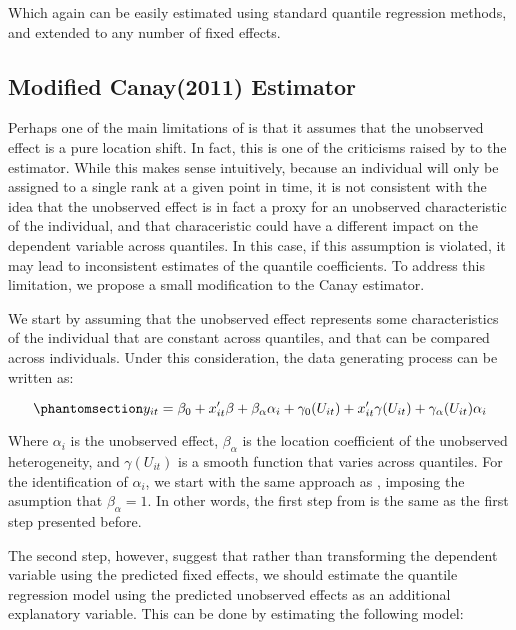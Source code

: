 \documentclass[bib]{statapress}
\begin{document}
Which again can be easily estimated using standard quantile regression
methods, and extended to any number of fixed effects.

\subsection{Modified Canay(2011) Estimator}\label{sec-mcanay}

Perhaps one of the main limitations of \citet{canay2011} is that it
assumes that the unobserved effect is a pure location shift. In fact,
this is one of the criticisms raised by \citet{mss2019} to the
estimator. While this makes sense intuitively, because an individual
will only be assigned to a single rank at a given point in time, it is
not consistent with the idea that the unobserved effect is in fact a
proxy for an unobserved characteristic of the individual, and that
characeristic could have a different impact on the dependent variable
across quantiles. In this case, if this assumption is violated, it may
lead to inconsistent estimates of the quantile coefficients. To address
this limitation, we propose a small modification to the Canay estimator.

We start by assuming that the unobserved effect represents some
characteristics of the individual that are constant across quantiles,
and that can be compared across individuals. Under this consideration,
the data generating process can be written as:

\begin{equation}\phantomsection\label{eq-mcanay-dgp}{y_{it} =\beta_0 +   x_{it}'\beta + \beta_\alpha \alpha_i+
\gamma_0(U_{it}) +  x_{it}'\gamma(U_{it}) + \gamma_\alpha(U_{it}) \alpha_i
}\end{equation}

Where \(\alpha_i\) is the unobserved effect, \(\beta_\alpha\) is the
location coefficient of the unobserved heterogeneity, and
\(\gamma(U_{it})\) is a smooth function that varies across quantiles.
For the identification of \(\alpha_i\), we start with the same approach
as \citet{canay2011}, imposing the asumption that \(\beta_\alpha=1\). In
other words, the first step from \citet{canay2011} is the same as the
first step presented before.

The second step, however, suggest that rather than transforming the
dependent variable using the predicted fixed effects, we should estimate
the quantile regression model using the predicted unobserved effects as
an additional explanatory variable. This can be done by estimating the
following model:
\end{document}
